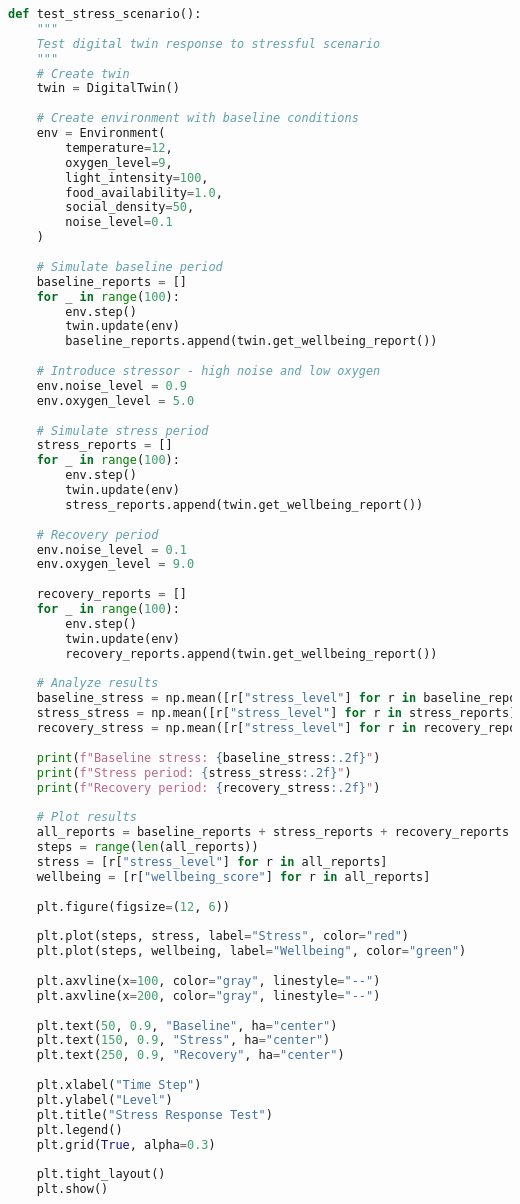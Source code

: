 \documentclass[11pt,a4paper]{article}
\begin{document}
\begin{lstlisting}[language=Python]
def test_stress_scenario():
    """
    Test digital twin response to stressful scenario
    """
    # Create twin
    twin = DigitalTwin()
    
    # Create environment with baseline conditions
    env = Environment(
        temperature=12,
        oxygen_level=9,
        light_intensity=100,
        food_availability=1.0,
        social_density=50,
        noise_level=0.1
    )
    
    # Simulate baseline period
    baseline_reports = []
    for _ in range(100):
        env.step()
        twin.update(env)
        baseline_reports.append(twin.get_wellbeing_report())
    
    # Introduce stressor - high noise and low oxygen
    env.noise_level = 0.9
    env.oxygen_level = 5.0
    
    # Simulate stress period
    stress_reports = []
    for _ in range(100):
        env.step()
        twin.update(env)
        stress_reports.append(twin.get_wellbeing_report())
    
    # Recovery period
    env.noise_level = 0.1
    env.oxygen_level = 9.0
    
    recovery_reports = []
    for _ in range(100):
        env.step()
        twin.update(env)
        recovery_reports.append(twin.get_wellbeing_report())
    
    # Analyze results
    baseline_stress = np.mean([r["stress_level"] for r in baseline_reports])
    stress_stress = np.mean([r["stress_level"] for r in stress_reports])
    recovery_stress = np.mean([r["stress_level"] for r in recovery_reports])
    
    print(f"Baseline stress: {baseline_stress:.2f}")
    print(f"Stress period: {stress_stress:.2f}")
    print(f"Recovery period: {recovery_stress:.2f}")
    
    # Plot results
    all_reports = baseline_reports + stress_reports + recovery_reports
    steps = range(len(all_reports))
    stress = [r["stress_level"] for r in all_reports]
    wellbeing = [r["wellbeing_score"] for r in all_reports]
    
    plt.figure(figsize=(12, 6))
    
    plt.plot(steps, stress, label="Stress", color="red")
    plt.plot(steps, wellbeing, label="Wellbeing", color="green")
    
    plt.axvline(x=100, color="gray", linestyle="--")
    plt.axvline(x=200, color="gray", linestyle="--")
    
    plt.text(50, 0.9, "Baseline", ha="center")
    plt.text(150, 0.9, "Stress", ha="center")
    plt.text(250, 0.9, "Recovery", ha="center")
    
    plt.xlabel("Time Step")
    plt.ylabel("Level")
    plt.title("Stress Response Test")
    plt.legend()
    plt.grid(True, alpha=0.3)
    
    plt.tight_layout()
    plt.show()
\end{lstlisting}
\end{document}
